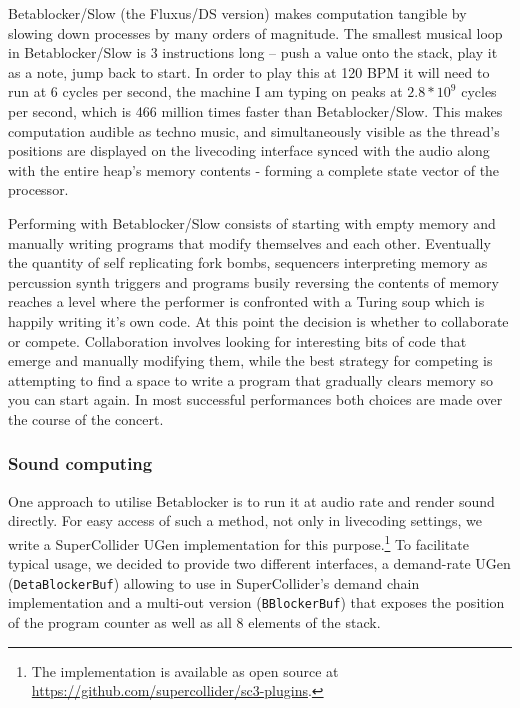 \documentclass[letterpaper, 12pt]{article}
\begin{document}
Betablocker/Slow (the Fluxus/DS version) makes computation tangible by slowing down processes by many orders of magnitude. 
The smallest musical loop in Betablocker/Slow is 3 instructions long -- push a value onto the stack, play it as a note, jump back to start. 
In order to play this at 120 BPM it will need to run at 6 cycles per second, the machine I am typing on peaks at $2.8*10^9$ cycles per second, which is 466 million times faster than Betablocker/Slow. This makes computation audible as techno music, and simultaneously visible as the thread's positions are displayed on the livecoding interface synced with the audio along with the entire heap's memory contents - forming a complete state vector of the processor.

Performing with Betablocker/Slow consists of starting with empty memory and manually writing programs that modify themselves and each other.
Eventually the quantity of self replicating fork bombs, sequencers interpreting memory as percussion synth triggers and programs busily reversing the contents of memory reaches a level where the performer is confronted with a Turing soup which is happily writing it's own code. 
At this point the decision is whether to collaborate or compete.
Collaboration involves looking for interesting bits of code that emerge and manually modifying them, while the best strategy for competing is attempting to find a space to write a program that gradually clears memory so you can start again. 
In most successful performances both choices are made over the course of the concert.


\subsubsection{Sound computing} 
\label{sub:sound_computing}

One approach to utilise Betablocker is to run it at audio rate and render sound directly.
For easy access of such a method, not only in livecoding settings, we write a SuperCollider UGen implementation for this purpose.\footnote{The implementation is available as open source at \url{https://github.com/supercollider/sc3-plugins}.}
To facilitate typical usage, we decided to provide two different interfaces, a demand-rate UGen (\verb#DetaBlockerBuf#) allowing to use in SuperCollider's demand chain implementation 
and a multi-out version (\verb#BBlockerBuf#) that exposes the position of the program counter as well as all 8 elements of the stack.
\end{document}
